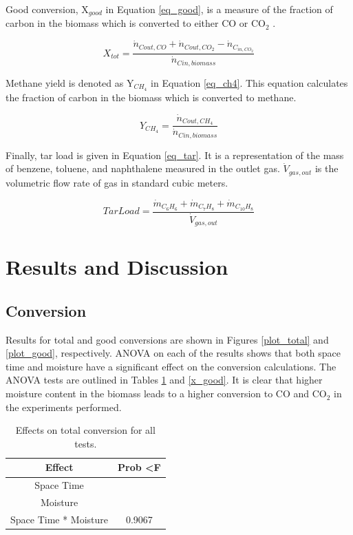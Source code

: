 \documentclass[11pt,twocolumn]{article}
\begin{document}
Good conversion, X$_{good}$ in Equation \ref{eq_good}, is a measure of the fraction of carbon in the biomass which is converted to either CO or CO$_2$ .

\begin{equation}
	X_{tot} = \frac{\dot{n}_{C out,CO} + \dot{n}_{C out,CO_2}- \dot{n}_{C_{in,CO_2}}}{\dot{n}_{C in,biomass}}
	\label{eq_good}
\end{equation}

Methane yield is denoted as Y$_{CH_4}$ in Equation \ref{eq_ch4}. This equation calculates the fraction of carbon in the biomass which is converted to methane.

\begin{equation}
	Y_{CH_4} = \frac{\dot{n}_{C out,CH_4}}{\dot{n}_{C in,biomass}}
	\label{eq_ch4}
\end{equation}

Finally, tar load is given in Equation \ref{eq_tar}. It is a representation of the mass of benzene, toluene, and naphthalene measured in the outlet gas. $\dot{V}_{gas,out}$ is the volumetric flow rate of gas in standard cubic meters.

\begin{equation}
	Tar Load = \frac{\dot{m}_{C_6H_6} + \dot{m}_{C_7H_8}+ \dot{m}_{C_{10}H_8}}{\dot{V}_{gas,out}}
	\label{eq_tar}
\end{equation}

\section*{Results and Discussion}

\subsection*{Conversion}

Results for total and good conversions are shown in Figures \ref{plot_total} and \ref{plot_good}, respectively.  ANOVA on each of the results shows that both space time and moisture have a significant effect on the conversion calculations.  The ANOVA tests are outlined in Tables \ref{x_total} and \ref{x_good}.  It is clear that higher moisture content in the biomass leads to a higher conversion to CO and CO$_2$ in the experiments performed.

\begin{table}
	\centering
	\caption{Effects on total conversion for all tests.}
	\label{x_total}
	\begin{tabular}{c c}
	\toprule
	Effect				&	Prob \textless F	\\
	\midrule
	Space Time			&	\color{red}{\textless 0.0001} \\
	Moisture				&	\color{red}{\textless 0.0001} \\
	Space Time * Moisture	&	0.9067 \\
	\bottomrule
	\end{tabular}
\end{table}
\end{document}
